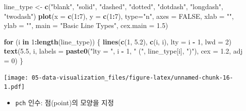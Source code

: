 \documentclass[
  11pt,
]{krantz}
\newenvironment{Shaded}{\begin{snugshade}}{\end{snugshade}}
\newcommand{\ControlFlowTok}[1]{\textcolor[rgb]{0.27,0.27,0.27}{\textbf{#1}}}
\newcommand{\DataTypeTok}[1]{\textcolor[rgb]{0.27,0.27,0.27}{#1}}
\newcommand{\DecValTok}[1]{\textcolor[rgb]{0.06,0.06,0.06}{#1}}
\newcommand{\FloatTok}[1]{\textcolor[rgb]{0.06,0.06,0.06}{#1}}
\newcommand{\KeywordTok}[1]{\textcolor[rgb]{0.27,0.27,0.27}{\textbf{#1}}}
\newcommand{\NormalTok}[1]{#1}
\newcommand{\OperatorTok}[1]{\textcolor[rgb]{0.43,0.43,0.43}{\textbf{#1}}}
\newcommand{\OtherTok}[1]{\textcolor[rgb]{0.37,0.37,0.37}{#1}}
\newcommand{\StringTok}[1]{\textcolor[rgb]{0.5,0.5,0.5}{#1}}
\providecommand{\tightlist}{%
  \setlength{\itemsep}{0pt}\setlength{\parskip}{0pt}}
\begin{document}
\footnotesize

\begin{Shaded}
\begin{Highlighting}[]
\NormalTok{line_type <-}\StringTok{ }\KeywordTok{c}\NormalTok{(}\StringTok{"blank"}\NormalTok{, }\StringTok{"solid"}\NormalTok{, }\StringTok{"dashed"}\NormalTok{, }\StringTok{"dotted"}\NormalTok{,}
               \StringTok{"dotdash"}\NormalTok{, }\StringTok{"longdash"}\NormalTok{, }\StringTok{"twodash"}\NormalTok{)}
\KeywordTok{plot}\NormalTok{(}\DataTypeTok{x =} \KeywordTok{c}\NormalTok{(}\DecValTok{1}\OperatorTok{:}\DecValTok{7}\NormalTok{), }\DataTypeTok{y =} \KeywordTok{c}\NormalTok{(}\DecValTok{1}\OperatorTok{:}\DecValTok{7}\NormalTok{), }\DataTypeTok{type=}\StringTok{"n"}\NormalTok{, }
     \DataTypeTok{axes =} \OtherTok{FALSE}\NormalTok{, }
     \DataTypeTok{xlab =} \StringTok{""}\NormalTok{, }
     \DataTypeTok{ylab =} \StringTok{""}\NormalTok{, }
     \DataTypeTok{main =} \StringTok{"Basic Line Types"}\NormalTok{, }
     \DataTypeTok{cex.main =} \FloatTok{1.5}\NormalTok{)}

\ControlFlowTok{for}\NormalTok{ (i }\ControlFlowTok{in} \DecValTok{1}\OperatorTok{:}\KeywordTok{length}\NormalTok{(line_type)) \{}
  \KeywordTok{lines}\NormalTok{(}\KeywordTok{c}\NormalTok{(}\DecValTok{1}\NormalTok{, }\FloatTok{5.2}\NormalTok{), }\KeywordTok{c}\NormalTok{(i, i), }\DataTypeTok{lty =}\NormalTok{ i }\OperatorTok{-}\StringTok{ }\DecValTok{1}\NormalTok{, }\DataTypeTok{lwd =} \DecValTok{2}\NormalTok{)  }
  \KeywordTok{text}\NormalTok{(}\FloatTok{5.5}\NormalTok{, i, }
       \DataTypeTok{labels =} \KeywordTok{paste0}\NormalTok{(}\StringTok{"lty = "}\NormalTok{, i }\OperatorTok{-}\StringTok{ }\DecValTok{1}\NormalTok{, }\StringTok{" ("}\NormalTok{, }
\NormalTok{                       line_type[i], }\StringTok{")"}\NormalTok{), }
       \DataTypeTok{cex =} \FloatTok{1.2}\NormalTok{, }
       \DataTypeTok{adj =} \DecValTok{0}\NormalTok{)}
\NormalTok{\}}
\end{Highlighting}
\end{Shaded}

\texttt{[image: 05-data-visualization\_files/figure-latex/unnamed-chunk-16-1.pdf]}

\normalsize

\begin{itemize}
\tightlist
\item
  \texttt{pch} 인수: 점(point)의 모양을 지정
\end{itemize}

\footnotesize
\end{document}
